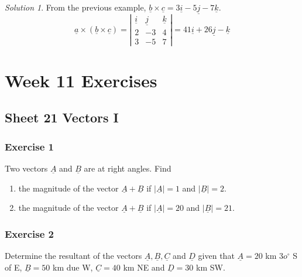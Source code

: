 \documentclass[
  11pt,
  oneside]{book}
\providecommand{\tightlist}{%
  \setlength{\itemsep}{0pt}\setlength{\parskip}{0pt}}
\newcommand{\slide}{}
\theoremstyle{definition}
\theoremstyle{definition}
\theoremstyle{definition}
\theoremstyle{definition}
\theoremstyle{remark}
\newtheorem*{solution}{Solution}
\begin{document}
\begin{solution}
From the previous example, \(\underline b \times\underline c = 3\underline i-5\underline j-7\underline k\).
\[
\underline a \times (\underline b \times\underline c) = \left|\begin{array}{ccc}\underline i&\underline j&\underline k\\2&-3&4\\3&-5&7\end{array}\right| = 41\underline i+26\underline j-\underline k
\]
\end{solution}

\chapter*{Week 11 Exercises}\label{week-11-exercises}

\section{Sheet 21 Vectors I}\label{sheet-21-vectors-i}

\subsection*{Exercise 1}\label{exercise-1-12}

Two vectors \(\underline A\) and \(\underline B\) are at right angles. Find

\begin{enumerate}
\def\labelenumi{\arabic{enumi}.}
\tightlist
\item
  the magnitude of the vector \(\underline A+\underline B\) if \(|\underline A| = 1\) and \(|\underline B| = 2\).
\item
  the magnitude of the vector \(\underline A+\underline B\) if \(|\underline A|=20\) and \(|\underline B| = 21\).
\end{enumerate}

\slide

\subsection*{Exercise 2}\label{exercise-2-12}

Determine the resultant of the vectors \(\underline A, \underline B, \underline C\) and \(\underline D\) given that \(\underline A = 20\) km \(3o^\circ\) S of E, \(\underline B = 50\) km due W, \(\underline C = 40\) km NE and \(\underline D=30\) km SW.
\end{document}
